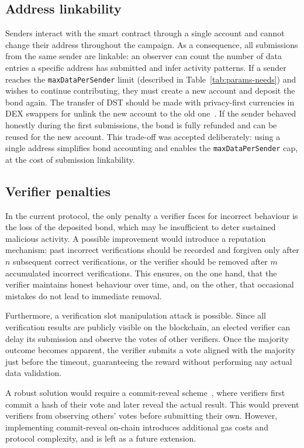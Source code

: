 \subsection{Address linkability}\label{subsec:security-analysis-issues-address-linkability}
Senders interact with the smart contract through a single account and cannot change their address throughout the campaign.
As a consequence, all submissions from the same sender are linkable: an observer can count the number of data entries a specific address has submitted and infer activity patterns.
If a sender reaches the \texttt{maxDataPerSender} limit (described in Table~\ref{tab:params-needs}) and wishes to continue contributing, they must create a new account and deposit the bond again.
The transfer of DST should be made with privacy-first currencies in DEX swappers for unlink the new account to the old one~\cite{montori2023privacy}.
If the sender behaved honestly during the first submissions, the bond is fully refunded and can be reused for the new account.
This trade-off was accepted deliberately: using a single address simplifies bond accounting and enables the \texttt{maxDataPerSender} cap, at the cost of submission linkability.

\subsection{Verifier penalties}\label{subsec:security-analysis-verifiers-no-penalties}
In the current protocol, the only penalty a verifier faces for incorrect behaviour is the loss of the deposited bond, which may be insufficient to deter sustained malicious activity.
A possible improvement would introduce a reputation mechanism: past incorrect verifications should be recorded and forgiven only after $n$ subsequent correct verifications, or the verifier should be removed after $m$ accumulated incorrect verifications.
This ensures, on the one hand, that the verifier maintains honest behaviour over time, and, on the other, that occasional mistakes do not lead to immediate removal.

Furthermore, a verification slot manipulation attack is possible.
Since all verification results are publicly visible on the blockchain, an elected verifier can delay its
submission and observe the votes of other verifiers.
Once the majority outcome becomes apparent, the verifier submits a vote
aligned with the majority just before the timeout, guaranteeing
the reward without performing any actual data validation.

A robust solution would require a commit-reveal scheme~\cite{brassard1988commitreveal, eip1011}, where verifiers first commit a hash of their vote and later reveal the actual result.
This would prevent verifiers from observing others' votes before submitting their own.
However, implementing commit-reveal on-chain introduces additional gas costs and protocol complexity, and is left as a future extension.

